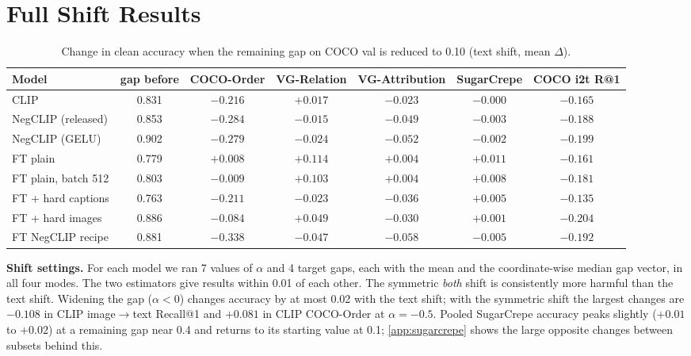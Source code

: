 \documentclass{article}
\begin{document}
\section{Full Shift Results}
\label{app:shift}

\begin{table}[H]
\caption{Change in clean accuracy when the remaining gap on COCO val is reduced to 0.10 (text shift, mean $\Delta$).}
\label{tab:closing}
\begin{center}
\begin{small}
\begin{tabular}{lcccccc}
\toprule
Model & gap before & COCO-Order & VG-Relation & VG-Attribution & SugarCrepe & COCO i2t R@1 \\
\midrule
CLIP & 0.831 & $-0.216$ & $+0.017$ & $-0.023$ & $-0.000$ & $-0.165$ \\
NegCLIP (released) & 0.853 & $-0.284$ & $-0.015$ & $-0.049$ & $-0.003$ & $-0.188$ \\
NegCLIP (GELU) & 0.902 & $-0.279$ & $-0.024$ & $-0.052$ & $-0.002$ & $-0.199$ \\
FT plain & 0.779 & $+0.008$ & $+0.114$ & $+0.004$ & $+0.011$ & $-0.161$ \\
FT plain, batch 512 & 0.803 & $-0.009$ & $+0.103$ & $+0.004$ & $+0.008$ & $-0.181$ \\
FT + hard captions & 0.763 & $-0.211$ & $-0.023$ & $-0.036$ & $+0.005$ & $-0.135$ \\
FT + hard images & 0.886 & $-0.084$ & $+0.049$ & $-0.030$ & $+0.001$ & $-0.204$ \\
FT NegCLIP recipe & 0.881 & $-0.338$ & $-0.047$ & $-0.058$ & $-0.005$ & $-0.192$ \\
\bottomrule
\end{tabular}
\end{small}
\end{center}
\end{table}

\textbf{Shift settings.} For each model we ran 7 values of $\alpha$ and 4 target gaps, each with the mean and the coordinate-wise median gap vector, in all four modes. The two estimators give results within 0.01 of each other. The symmetric \emph{both} shift is consistently more harmful than the text shift. Widening the gap ($\alpha<0$) changes accuracy by at most 0.02 with the text shift; with the symmetric shift the largest changes are $-0.108$ in CLIP image$\to$text Recall@1 and $+0.081$ in CLIP COCO-Order at $\alpha=-0.5$. Pooled SugarCrepe accuracy peaks slightly ($+0.01$ to $+0.02$) at a remaining gap near 0.4 and returns to its starting value at 0.1; \cref{app:sugarcrepe} shows the large opposite changes between subsets behind this.
\end{document}
